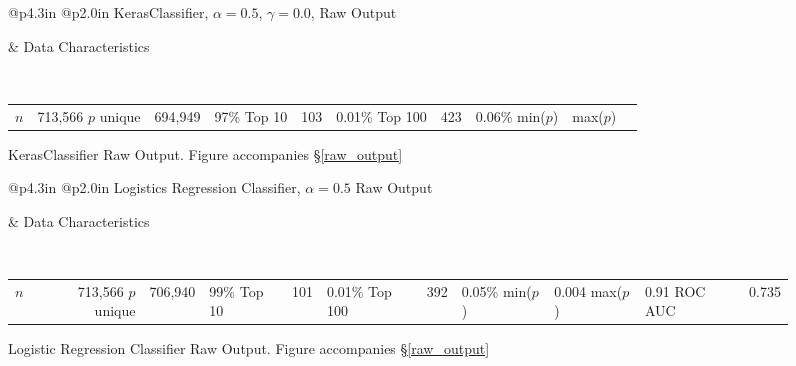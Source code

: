 \begin{figure}[h]
\noindent\begin{tabular}{@{\hspace{-6pt}}p{4.3in} @{\hspace{-6pt}}p{2.0in}}
	\vskip 0pt
	\hfil {\normalfont\normalsize KerasClassifier, $\alpha = 0.5$, $\gamma = 0.0$, Raw Output}
	
		
&
	\normalfont\normalsize 
	\vskip 0pt
	Data Characteristics
	
	\
	
	\begin{tabular}{rrr}
		$n$ & 713,566 \cr
		$p$ unique & 694,949 & 97\% \cr
		Top 10 & 103 & 0.01\% \cr
		Top 100 & 423 & 0.06\% \cr
		min($p$) & \cr
		max($p$) & \cr
	\end{tabular}
\cr
\end{tabular}

\caption{\normalfont\normalsize KerasClassifier Raw Output.  Figure accompanies \S\ref{raw_output}}
\label{KBFC_raw}
\end{figure}

\begin{figure}[h]
\noindent\begin{tabular}{@{\hspace{-6pt}}p{4.3in} @{\hspace{-6pt}}p{2.0in}}
	\vskip 0pt
	\hfil {\normalfont\normalsize Logistics Regression Classifier, $\alpha = 0.5$ Raw Output}
	
		
&
	\normalfont\normalsize 
	\vskip 0pt
	Data Characteristics
	
	\
	
	\begin{tabular}{rrr}
		$n$ & 713,566 \cr
		$p$ unique & 706,940 & 99\% \cr
		Top 10 & 101 & 0.01\% \cr
		Top 100 & 392 & 0.05\% \cr
		min($p$) & 0.004 \cr
		max($p$) & 0.91 \cr
		ROC AUC & 0.735 \cr
	\end{tabular}
\cr
\end{tabular}

\caption{\normalfont\normalsize Logistic Regression Classifier Raw Output.  Figure accompanies \S\ref{raw_output}}
\label{LogReg_raw}
\end{figure}


